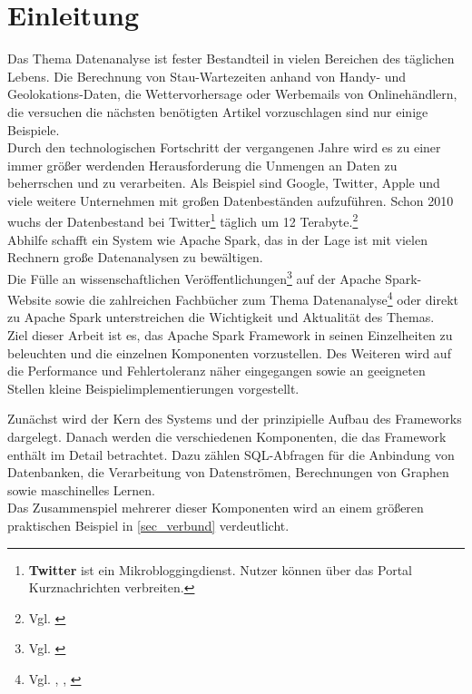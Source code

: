 \newpage
\chapter{Einleitung} 

Das Thema Datenanalyse ist fester Bestandteil in vielen Bereichen des täglichen Lebens. Die Berechnung von Stau-Wartezeiten anhand von Handy- und Geolokations-Daten, die Wettervorhersage oder Werbemails von Onlinehändlern, die versuchen die nächsten benötigten Artikel vorzuschlagen sind nur einige Beispiele.\\

\noindent
Durch den technologischen Fortschritt der vergangenen Jahre wird es zu einer immer größer werdenden Herausforderung die Unmengen an Daten zu beherrschen und zu verarbeiten. Als Beispiel sind Google, Twitter, Apple und viele weitere Unternehmen mit großen Datenbeständen aufzuführen. Schon 2010 wuchs der Datenbestand bei Twitter\footnote{\textbf{Twitter} ist ein Mikrobloggingdienst. Nutzer können über das Portal Kurznachrichten verbreiten. } täglich um 12 Terabyte.\footnote{Vgl. \cite{TWITTER_12}} \\
Abhilfe schafft ein System wie Apache Spark, das in der Lage ist mit vielen Rechnern große Datenanalysen zu bewältigen. \\

\noindent
Die Fülle an wissenschaftlichen Veröffentlichungen\footnote{Vgl. \cite{SPRESEARCH}} auf der Apache Spark-Website sowie die zahlreichen Fachbücher zum Thema Datenanalyse\footnote{Vgl. \cite{DA15}, \cite{AAWS15}, \cite{BDS16}} oder direkt zu Apache Spark unterstreichen die Wichtigkeit und Aktualität des Themas.\\

\noindent
Ziel dieser Arbeit ist es, das Apache Spark Framework in seinen Einzelheiten zu beleuchten und die einzelnen Komponenten vorzustellen. Des Weiteren wird auf die Performance und Fehlertoleranz näher eingegangen sowie an geeigneten Stellen kleine Beispielimplementierungen vorgestellt.

\noindent
Zunächst wird der Kern des Systems und der prinzipielle Aufbau des Frameworks dargelegt. Danach werden die verschiedenen Komponenten, die das Framework enthält im Detail betrachtet. Dazu zählen SQL-Abfragen für die Anbindung von Datenbanken, die Verarbeitung von Datenströmen, Berechnungen von Graphen sowie maschinelles Lernen.\\
Das Zusammenspiel mehrerer dieser Komponenten wird an einem größeren praktischen Beispiel in \autoref{sec_verbund} verdeutlicht. \\

